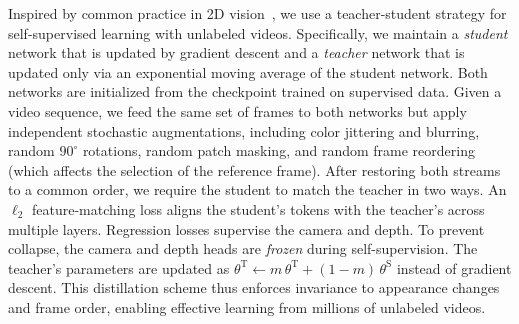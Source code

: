 Inspired by common practice in 2D vision~\cite{he20momentum, caron21emerging,oquab24dinov2:, simeoni25dinov3}, we use a teacher-student strategy for self-supervised learning with unlabeled videos.
Specifically, we maintain a \emph{student} network that is updated by gradient descent and a \emph{teacher} network that is updated only via an exponential moving average of the student network.
Both networks are initialized from the \method checkpoint trained on supervised data.
Given a video sequence, we feed the same set of frames to both networks but apply independent stochastic augmentations, including color jittering and blurring, random $90^\circ$ rotations, random patch masking, and random frame reordering (which affects the selection of the reference frame).
After restoring both streams to a common order, we require the student to match the teacher in two ways.
An $\ell_2$ feature-matching loss aligns the student's tokens with the teacher's across multiple layers.
Regression losses supervise the camera and depth.
To prevent collapse, the camera and depth heads are \emph{frozen} during self-supervision.
The teacher's parameters are updated as $\theta^{\mathrm{T}} \leftarrow m\,\theta^{\mathrm{T}} + (1-m)\,\theta^{\mathrm{S}}$ instead of gradient descent.
This distillation scheme thus enforces invariance to appearance changes and frame order, enabling effective learning from millions of unlabeled videos.
